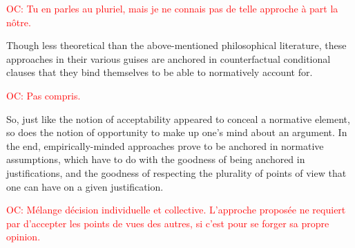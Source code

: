 \documentclass[preprint,11pt]{elsarticle}
\newcommand{\commentOC}[1]{\textcolor{red}{OC: #1}}
\begin{document}
\commentOC{Tu en parles au pluriel, mais je ne
connais pas de telle approche à part la nôtre.}

 Though less theoretical than the above-mentioned philosophical literature, these approaches in their various guises are anchored in counterfactual conditional clauses that they bind themselves to be able to normatively account for. 
 
 \commentOC{ Pas compris.}
 
 So, just like the notion of acceptability appeared to conceal a normative element, so does the notion of opportunity to make up one’s mind about an argument. In the end, empirically-minded approaches prove to be anchored in normative assumptions, which have to do with the goodness of being anchored in justifications, and the goodness of respecting the plurality of points of view that one can have on a given justification.
 
 \commentOC{Mélange décision individuelle et
collective. L’approche proposée ne requiert par d’accepter
les points de vues des autres, si c’est pour se forger sa
propre opinion.}
 
\end{document}
